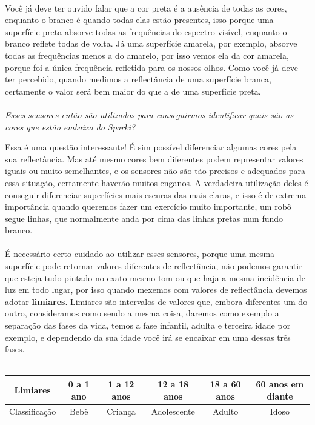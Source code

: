 \paragraph{}
Você já deve ter ouvido falar que a cor preta é a ausência de todas as cores, enquanto o branco é quando todas elas estão presentes, isso porque uma superfície preta absorve todas as frequências do espectro visível, enquanto o branco reflete todas de volta. Já uma superfície amarela, por exemplo, absorve todas as frequências menos a do amarelo, por isso vemos ela da cor amarela, porque foi a única frequência refletida para os nossos olhos. Como você já deve ter percebido, quando medimos a reflectância de uma superfície branca, certamente o valor será bem maior do que a de uma superfície preta.
\\~\\
\textit{Esses sensores então são utilizados para conseguirmos identificar quais são as cores que estão embaixo do Sparki?} \par
Essa é uma questão interessante! É sim possível diferenciar algumas cores pela sua reflectância. Mas até mesmo cores bem diferentes podem representar valores iguais ou muito semelhantes, e os sensores não são tão precisos e adequados para essa situação, certamente haverão muitos enganos. A verdadeira utilização deles é conseguir diferenciar superfícies mais escuras das mais claras, e isso é de extrema importância quando queremos fazer um exercício muito importante, um robô segue linhas, que normalmente anda por cima das linhas pretas num fundo branco.

\paragraph{}
É necessário certo cuidado ao utilizar esses sensores, porque uma mesma superfície pode retornar valores diferentes de reflectância, não podemos garantir que esteja tudo pintado no exato mesmo tom ou que haja a mesma incidência de luz em todo lugar, por isso quando mexemos com valores de reflectância devemos adotar \textbf{limiares}. Limiares são intervalos de valores que, embora diferentes um do outro, consideramos como sendo a mesma coisa, daremos como exemplo a separação das fases da vida, temos a fase infantil, adulta e terceira idade por exemplo, e dependendo da sua idade você irá se encaixar em uma dessas três fases.
\\~\\
\begin{tabular}{|c|c|c|c|c|c|}
    \cline{1-6}
     Limiares & 0 a 1 ano & 1 a 12 anos & 12 a 18 anos & 18 a 60 anos & 60 anos em diante \\
     \hline
     Classificação & Bebê & Criança & Adolescente & Adulto & Idoso \\
     \hline
\end{tabular}

